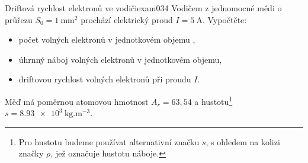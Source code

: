 \begin{fyzexam}{Driftová rychlost elektronů ve vodiči}{exam034}
  Vodičem z jednomocné mědi o průřezu $S_0 = \qty{1}{\mm^2}$ prochází elektrický proud $I =
  \qty{5}{\A}$. Vypočtěte:
  \begin{itemize}[noitemsep, leftmargin=2em]
    \item počet volných elektronů v jednotkovém objemu ,
    \item úhrnný náboj volných elektronů v jednotkovém objemu,
    \item driftovou rychlost volných elektronů při proudu \(I\).
  \end{itemize}

  Měď má poměrnou atomovou hmotnost $A_r = 63,54$ a hustotu\footnote{Pro hustotu budeme používat 
  alternativní značku $s$, s ohledem na kolizi značky $\rho$, jež označuje hustotu náboje.} $s = 
  \qty{8.93e3}{\kg.\m^{-3}}$. 


\end{fyzexam}
